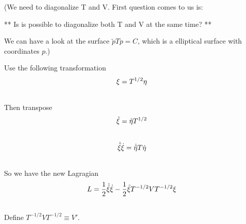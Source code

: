 \documentclass[letterpaper,10pt,english]{sphinxmanual}
\begin{document}
(We need to diagonalize T and V. First question comes to us is:

** Is is possible to diagonalize both T and V at the same time? **

We can have a look at the surface $\tilde p T p = C$, which is a elliptical surface with coordinates $p$.)

Use the following transformation
\begin{gather}
\begin{split}\xi = T^{1/2}\eta\end{split}\notag\\\begin{split}\end{split}\notag
\end{gather}
Then transpose
\begin{gather}
\begin{split}\tilde \xi = \tilde \eta T^{1/2}\end{split}\notag\\\begin{split}\end{split}\notag
\end{gather}\begin{gather}
\begin{split}\dot{\tilde \xi} \dot \xi = \dot {\tilde \eta} T \dot \eta\end{split}\notag\\\begin{split}\end{split}\notag
\end{gather}
So we have the new Lagragian
\begin{gather}
\begin{split}L = \frac{1}{2} \dot{\tilde \xi} \dot \xi - \frac{1}{2} \tilde \xi T^{-1/2} V T^{-1/2} \xi\end{split}\notag\\\begin{split}\end{split}\notag
\end{gather}
Define $T^{-1/2} V T^{-1/2} \equiv V'$.
\end{document}
